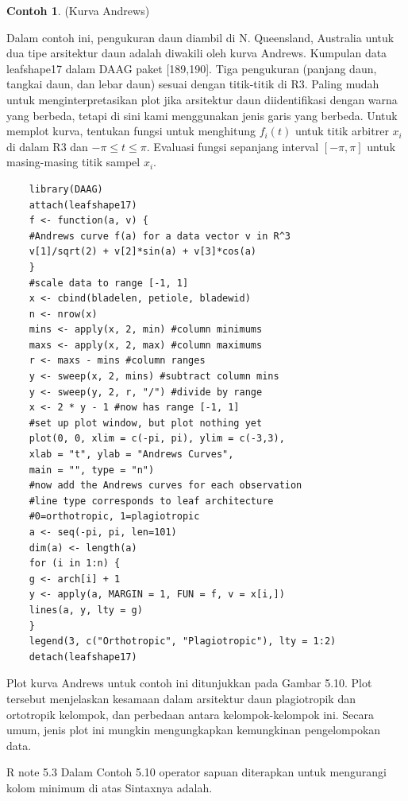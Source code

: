 \documentclass[a4paper,12pt]{article}
\theoremstyle{definition}
\newtheorem{example}{Contoh}[section]
\begin{document}
\begin{example} (Kurva Andrews)

Dalam contoh ini, pengukuran daun diambil di N. Queensland, Australia untuk dua tipe arsitektur daun \cite{King1999} adalah diwakili oleh kurva Andrews. Kumpulan data leafshape17 dalam DAAG paket [189,190]. Tiga pengukuran (panjang daun, tangkai daun, dan lebar daun) sesuai dengan titik-titik di R3. Paling mudah untuk menginterpretasikan plot jika arsitektur daun diidentifikasi dengan warna yang berbeda, tetapi di sini kami menggunakan jenis garis yang berbeda. Untuk memplot kurva, tentukan fungsi untuk menghitung $f_i(t)$ untuk titik arbitrer $x_i$ di dalam R3 dan $-\pi\leq t\leq \pi $. Evaluasi fungsi sepanjang interval $[-\pi,\pi]$ untuk masing-masing titik sampel $x_i$.

\begin{lstlisting}
    library(DAAG)
    attach(leafshape17)
    f <- function(a, v) {
    #Andrews curve f(a) for a data vector v in R^3
    v[1]/sqrt(2) + v[2]*sin(a) + v[3]*cos(a)
    }
    #scale data to range [-1, 1]
    x <- cbind(bladelen, petiole, bladewid)
    n <- nrow(x)
    mins <- apply(x, 2, min) #column minimums
    maxs <- apply(x, 2, max) #column maximums
    r <- maxs - mins #column ranges
    y <- sweep(x, 2, mins) #subtract column mins
    y <- sweep(y, 2, r, "/") #divide by range
    x <- 2 * y - 1 #now has range [-1, 1]
    #set up plot window, but plot nothing yet
    plot(0, 0, xlim = c(-pi, pi), ylim = c(-3,3),
    xlab = "t", ylab = "Andrews Curves",
    main = "", type = "n")
    #now add the Andrews curves for each observation
    #line type corresponds to leaf architecture
    #0=orthotropic, 1=plagiotropic
    a <- seq(-pi, pi, len=101)
    dim(a) <- length(a)
    for (i in 1:n) {
    g <- arch[i] + 1
    y <- apply(a, MARGIN = 1, FUN = f, v = x[i,])
    lines(a, y, lty = g)
    }
    legend(3, c("Orthotropic", "Plagiotropic"), lty = 1:2)
    detach(leafshape17)
\end{lstlisting}

Plot kurva Andrews untuk contoh ini ditunjukkan pada Gambar 5.10. Plot tersebut menjelaskan kesamaan dalam arsitektur daun plagiotropik dan ortotropik kelompok, dan perbedaan antara kelompok-kelompok ini. Secara umum, jenis plot ini mungkin mengungkapkan kemungkinan pengelompokan data.
\end{example}

R note 5.3
Dalam Contoh 5.10 operator sapuan diterapkan untuk mengurangi kolom minimum di atas Sintaxnya adalah.
\end{document}
